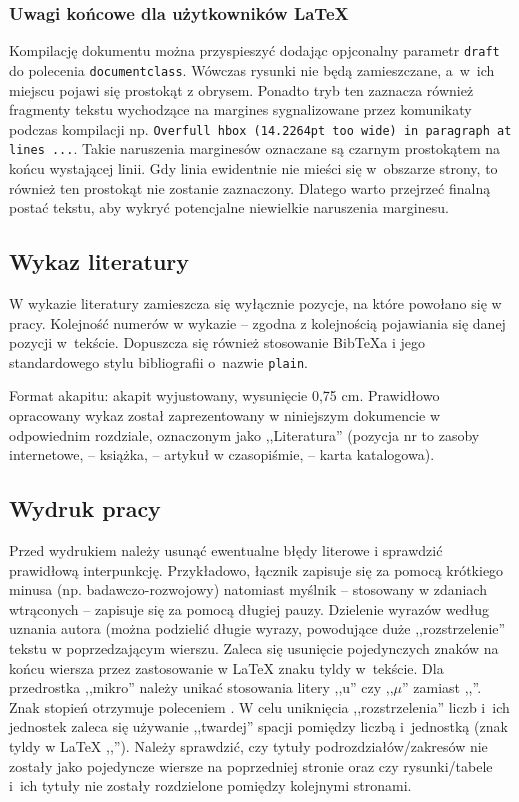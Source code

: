 \documentclass[12pt,twoside,openright]{article}
\begin{document}
\subsubsection{Uwagi końcowe dla użytkowników \LaTeX}
Kompilację dokumentu można przyspieszyć dodając opjconalny parametr \texttt{draft} do polecenia \texttt{documentclass}. 
Wówczas rysunki nie będą zamieszczane, a~w~ich miejscu pojawi się prostokąt z obrysem.
Ponadto tryb ten zaznacza również fragmenty tekstu wychodzące na margines sygnalizowane przez komunikaty podczas kompilacji np. \texttt{Overfull hbox (14.2264pt too wide) in paragraph at lines ...}.
Takie naruszenia marginesów oznaczane są czarnym prostokątem na końcu wystającej linii. 
Gdy linia ewidentnie nie mieści się w~obszarze strony, to również ten prostokąt nie zostanie zaznaczony. 
Dlatego warto przejrzeć finalną postać tekstu, aby wykryć potencjalne niewielkie naruszenia marginesu.

\subsection{Wykaz literatury}

W wykazie literatury zamieszcza się wyłącznie pozycje, na które powołano się
w pracy. Kolejność numerów w wykazie -- zgodna z kolejnością pojawiania się danej
pozycji w~tekście.
Dopuszcza się również stosowanie Bib\TeX{}a i jego standardowego stylu bibliografii o~nazwie \verb|plain|.

Format akapitu: akapit wyjustowany, wysunięcie 0,75 cm. Prawidłowo opracowany
wykaz został zaprezentowany w niniejszym dokumencie w odpowiednim rozdziale, oznaczonym jako ,,Literatura''  (pozycja nr \cite{str} to zasoby internetowe,
\cite{Jakubczyk1997} -- książka, \cite{Barski2011} -- artykuł w czasopiśmie, \cite{dokum} -- karta katalogowa).

\subsection{Wydruk pracy}

Przed wydrukiem należy usunąć ewentualne błędy literowe i sprawdzić prawidłową
interpunkcję.
Przykładowo, łącznik zapisuje się za pomocą krótkiego minusa (np.
badaw\-czo-rozwojowy) natomiast myślnik -- stosowany w zdaniach wtrąconych -- zapisuje
się za pomocą długiej pauzy.
Dzielenie wyrazów według uznania autora (można podzielić
długie wyrazy, powodujące duże ,,rozstrzelenie'' tekstu w poprzedzającym wierszu.
Zaleca się usunięcie pojedynczych znaków na końcu wiersza przez zastosowanie w \LaTeX{} znaku tyldy w~tekście.
Dla przedrostka ,,mikro'' należy unikać stosowania litery ,,u'' czy ,,$\mu$'' zamiast ,,\microS''. 
Znak stopień otrzymuje poleceniem .
W celu uniknięcia ,,rozstrzelenia'' liczb i~ich jednostek zaleca się używanie ,,twardej'' spacji pomiędzy liczbą i~jednostką (znak tyldy w \LaTeX{} ,,'').
Należy sprawdzić, czy tytuły
podrozdziałów/zakresów nie zostały jako pojedyncze wiersze na poprzedniej stronie oraz
czy rysunki/tabele i~ich tytuły nie zostały rozdzielone pomiędzy kolejnymi stronami.
\end{document}
